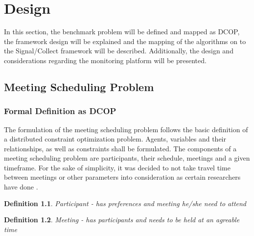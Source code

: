 \chapter{Design}

In this section, the benchmark problem will be defined and mapped as DCOP, the framework design will be explained and the mapping of the algorithms on to the Signal/Collect framework will be described. Additionally, the design and considerations regarding the monitoring platform will be presented.

\section{Meeting Scheduling Problem}

\subsection{Formal Definition as DCOP}

The formulation of the meeting scheduling problem follows the basic definition of a distributed constraint optimization problem. Agents, variables and their relationships, as well as constraints shall be formulated. The components of a meeting scheduling problem are participants, their schedule, meetings and a given timeframe. For the sake of simplicity, it was decided to not take travel time between meetings or other parameters into consideration as certain researchers have done \cite{Grubshtein}. %

\theoremstyle{hardconstraint2}
\newtheorem{hardconstraint2}{Definition}
\begin{hardconstraint2}
Participant - has preferences and meeting he/she need to attend
\end{hardconstraint2}
\begin{hardconstraint2}
Meeting - has participants and needs to be held at an agreable time
\end{hardconstraint2}

